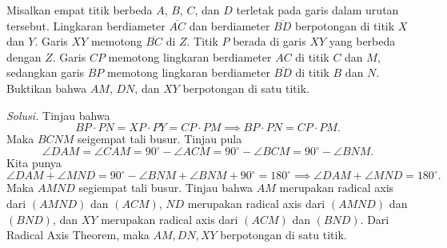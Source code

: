 \documentclass[a4paper, 11pt]{article}
\begin{document}
\begin{center}
\end{center}
\newpage
\begin{tcolorbox}[title=\textbf{Soal 7: IMO 1995/1}]
Misalkan empat titik berbeda $A$, $B$, $C$, dan $D$ terletak pada garis dalam urutan tersebut. Lingkaran berdiameter $\overline{AC}$ dan berdiameter $\overline{BD}$ berpotongan di titik $X$ dan $Y$. Garis $XY$ memotong $\overline{BC}$ di $Z$. Titik $P$ berada di garis $XY$ yang berbeda dengan $Z$. Garis $CP$ memotong lingkaran berdiameter $AC$ di titik $C$ dan $M$, sedangkan garis $BP$ memotong lingkaran berdiameter $\overline{BD}$ di titik $B$ dan $N$. Buktikan bahwa $AM$, $DN$, dan $XY$ berpotongan di satu titik.
\end{tcolorbox}
\noindent\textit{Solusi.} Tinjau bahwa
\[BP\cdot PN=XP\cdot PY = CP\cdot PM\implies BP\cdot PN = CP\cdot PM.\]
Maka $BCNM$ seigempat tali busur. Tinjau pula
\[\angle DAM=\angle CAM=90^\circ-\angle ACM=90^\circ-\angle BCM=90^\circ-\angle BNM.\]
Kita punya \[\angle DAM+\angle MND=90^\circ-\angle BNM+\angle BNM+90^\circ=180^\circ\implies \angle DAM+\angle MND=180^\circ.\] Maka $AMND$ segiempat tali busur. Tinjau bahwa $AM$ merupakan radical axis dari $(AMND)$ dan $(ACM)$, $ND$ merupakan radical axis dari $(AMND)$ dan $(BND)$, dan $XY$ merupakan radical axis dari $(ACM)$ dan $(BND)$. Dari {Radical Axis Theorem}, maka $AM,DN,XY$ berpotongan di satu titik.
\end{document}
